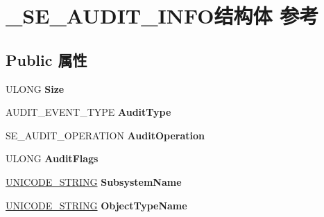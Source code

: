 \hypertarget{struct___s_e___a_u_d_i_t___i_n_f_o}{}\section{\+\_\+\+S\+E\+\_\+\+A\+U\+D\+I\+T\+\_\+\+I\+N\+F\+O结构体 参考}
\label{struct___s_e___a_u_d_i_t___i_n_f_o}
\subsection*{Public 属性}
\begin{DoxyCompactItemize}
\item 
\mbox{\label{struct___s_e___a_u_d_i_t___i_n_f_o_a9d1a9e6805d8848228d268c4741c4515}} 
U\+L\+O\+NG {\bfseries Size}
\item 
\mbox{\label{struct___s_e___a_u_d_i_t___i_n_f_o_a914772c171f4b9c9a416c3422b4886d7}} 
A\+U\+D\+I\+T\+\_\+\+E\+V\+E\+N\+T\+\_\+\+T\+Y\+PE {\bfseries Audit\+Type}
\item 
\mbox{\label{struct___s_e___a_u_d_i_t___i_n_f_o_a91caf234a555565b1f5bad208395c0ee}} 
S\+E\+\_\+\+A\+U\+D\+I\+T\+\_\+\+O\+P\+E\+R\+A\+T\+I\+ON {\bfseries Audit\+Operation}
\item 
\mbox{\label{struct___s_e___a_u_d_i_t___i_n_f_o_a28bcea2dcf172cc2d96e408c8cd1076b}} 
U\+L\+O\+NG {\bfseries Audit\+Flags}
\item 
\mbox{\label{struct___s_e___a_u_d_i_t___i_n_f_o_a6b49e719592d217b337b686c105a5a14}} 
\hyperlink{struct___u_n_i_c_o_d_e___s_t_r_i_n_g}{U\+N\+I\+C\+O\+D\+E\+\_\+\+S\+T\+R\+I\+NG} {\bfseries Subsystem\+Name}
\item 
\mbox{\label{struct___s_e___a_u_d_i_t___i_n_f_o_a8f1aa3c3a356ac7c50c3f94cd35408ad}} 
\hyperlink{struct___u_n_i_c_o_d_e___s_t_r_i_n_g}{U\+N\+I\+C\+O\+D\+E\+\_\+\+S\+T\+R\+I\+NG} {\bfseries Object\+Type\+Name}
\item 
\mbox{\label{struct___s_e___a_u_d_i_t___i_n_f_o_a45f1e3bb5836f9975520cfb8fa5e697b}} 

\end{DoxyCompactItemize}
